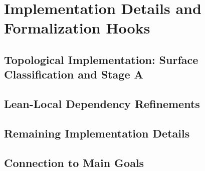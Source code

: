 \section{Implementation Details and Formalization Hooks}
\label{sec:impl-details}

\subsection{Topological Implementation: Surface Classification and Stage A}



\subsection{Lean-Local Dependency Refinements}







































\subsection{Remaining Implementation Details}









\subsection{Connection to Main Goals}




